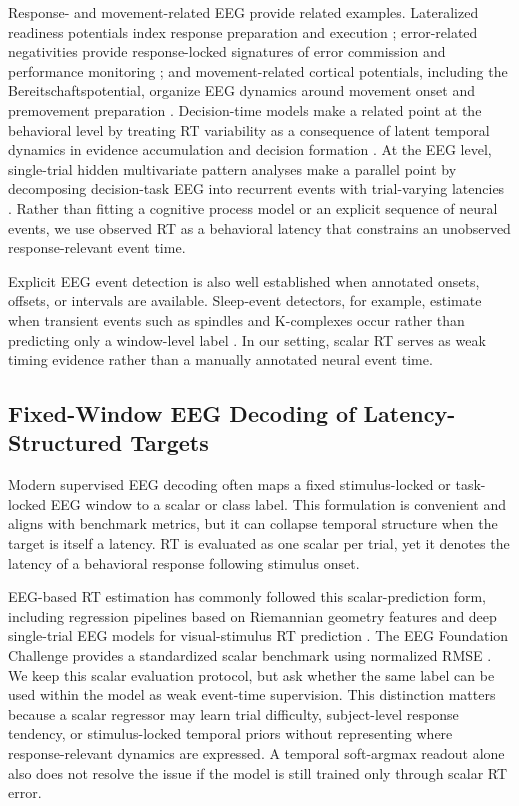 \documentclass[12pt]{article}
\begin{document}
Response- and movement-related EEG provide related examples. Lateralized readiness potentials index response preparation and execution \citep{Coles1989LRP}; error-related negativities provide response-locked signatures of error commission and performance monitoring \citep{Gehring1993ErrorDetection,HolroydColes2002ERN}; and movement-related cortical potentials, including the Bereitschaftspotential, organize EEG dynamics around movement onset and premovement preparation \citep{KornhuberDeecke1965BP,ShibasakiHallett2006BP}. Decision-time models make a related point at the behavioral level by treating RT variability as a consequence of latent temporal dynamics in evidence accumulation and decision formation \citep{Ratcliff2008Diffusion,OConnell2012Supramodal,Kelly2013Internal}. At the EEG level, single-trial hidden multivariate pattern analyses make a parallel point by decomposing decision-task EEG into recurrent events with trial-varying latencies \citep{Weindel2025DecisionComponents}. Rather than fitting a cognitive process model or an explicit sequence of neural events, we use observed RT as a behavioral latency that constrains an unobserved response-relevant event time.

Explicit EEG event detection is also well established when annotated onsets, offsets, or intervals are available. Sleep-event detectors, for example, estimate when transient events such as spindles and K-complexes occur rather than predicting only a window-level label \citep{Chambon2019DOSED,TapiaRivas2024SEED}. In our setting, scalar RT serves as weak timing evidence rather than a manually annotated neural event time.

\subsection{Fixed-Window EEG Decoding of Latency-Structured Targets}
Modern supervised EEG decoding often maps a fixed stimulus-locked or task-locked EEG window to a scalar or class label. This formulation is convenient and aligns with benchmark metrics, but it can collapse temporal structure when the target is itself a latency. RT is evaluated as one scalar per trial, yet it denotes the latency of a behavioral response following stimulus onset.

EEG-based RT estimation has commonly followed this scalar-prediction form, including regression pipelines based on Riemannian geometry features \citep{Wu2017RiemannianRT} and deep single-trial EEG models for visual-stimulus RT prediction \citep{Chowdhury2020RTSensors}. The EEG Foundation Challenge provides a standardized scalar benchmark using normalized RMSE \citep{EEGFoundationChallengeArxiv2025,EEGChallengeWebsite2025}. We keep this scalar evaluation protocol, but ask whether the same label can be used within the model as weak event-time supervision. This distinction matters because a scalar regressor may learn trial difficulty, subject-level response tendency, or stimulus-locked temporal priors without representing where response-relevant dynamics are expressed. A temporal soft-argmax readout alone also does not resolve the issue if the model is still trained only through scalar RT error.
\end{document}
